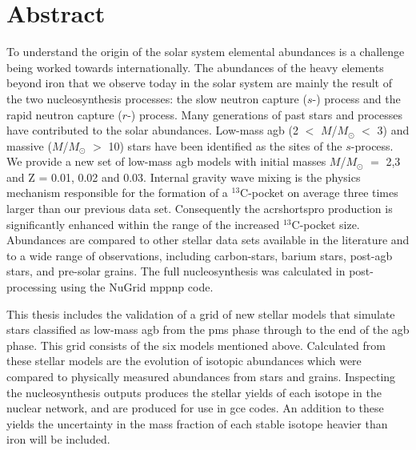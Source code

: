 \chapter{Abstract}

To understand the origin of the solar system elemental abundances is a challenge being worked towards internationally. The abundances of the heavy elements beyond iron that we observe today in the solar system are mainly the result of the two nucleosynthesis processes: the slow neutron capture ($s$-) process and the rapid neutron capture ($r$-) process. Many generations of past stars and processes have contributed to the solar abundances. Low-mass \acrfull{agb} (2 $<$ $M$/$M_\odot$ $<$ 3) and massive ($M$/$M_\odot$ $>$ 10) stars have been identified as the sites of the $s$-process. We provide a new set of low-mass \acrshort{agb} models with initial masses $M$/$M_\odot$ $=$ 2,3 and Z = 0.01, 0.02 and 0.03. Internal gravity wave mixing is the physics mechanism responsible for the formation of a $^{13}$C-pocket on average three times larger than our previous data set. Consequently the acrshort{spro} production is significantly enhanced within the range of the increased $^{13}$C-pocket size. Abundances are compared to other stellar data sets available in the literature and to a wide range of observations, including carbon-stars, barium stars, post-\acrshort{agb} stars, and pre-solar grains. The full nucleosynthesis was calculated in post-processing using the NuGrid mppnp code.

This thesis includes the validation of a grid of new stellar models that simulate stars classified as low-mass \acrshort{agb} from the \acrlong{pms} phase through to the end of the \acrshort{agb} phase. This grid consists of the six models mentioned above. Calculated from these stellar models are the evolution of isotopic abundances which were compared to physically measured abundances from stars and grains. Inspecting the nucleosynthesis outputs produces the stellar yields of each isotope in the nuclear network, and are produced for use in \acrfull{gce} codes. An addition to these yields the uncertainty in the mass fraction of each stable isotope heavier than iron will be included. 
